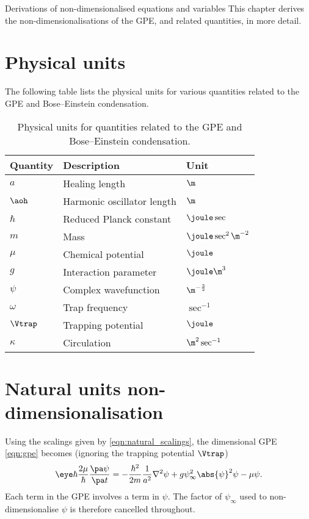 
\begin{chapter}{\label{cha:nondim}Derivations of non-dimensionalised equations
and variables}
  This chapter derives the non-dimensionalisations of the GPE, and related
  quantities, in more detail.

  \section{Physical units}
  The following table lists the physical units for various quantities
  related to the GPE and Bose--Einstein condensation.
  \begin{table}[h]
    \centering
    \begin{tabular}{lll}
      \hline
      Quantity & Description & Unit \\
      \hline
      $a$      & Healing length & $\m$ \\
      $\aoh$   & Harmonic oscillator length & $\m$ \\
      $\hbar$  & Reduced Planck constant & $\joule\sec$ \\
      $m$      & Mass & $\joule\sec^{2}\m^{-2}$ \\
      $\mu$    & Chemical potential & $\joule$ \\
      $g$      & Interaction parameter & $\joule\m^{3}$ \\
      $\psi$   & Complex wavefunction & $\m^{-\frac{3}{2}}$ \\
      $\omega$ & Trap frequency & $\sec^{-1}$ \\
      $\Vtrap$ & Trapping potential & $\joule$ \\
      $\kappa$ & Circulation & $\m^{2}\sec^{-1}$ \\
      \hline\hline
    \end{tabular}
    \caption{Physical units for quantities related to the GPE and
      Bose--Einstein condensation.}
  \end{table}
  
  \section{Natural units non-dimensionalisation}
  Using the scalings given by \eqref{eqn:natural_scalings}, the dimensional GPE
  \eqref{eqn:gpe} becomes (ignoring the trapping potential $\Vtrap$)
  \begin{equation*}
    \eye \hbar \frac{2\mu}{\hbar} \frac{\pa \psi}{\pa t} =
    -\frac{\hbar^{2}}{2m} \frac{1}{a^{2}} \nabla^{2} \psi + g \psi_{\infty}^{2}
    \abs{\psi}^{2} \psi - \mu \psi.
  \end{equation*}
  Each term in the GPE involves a term in $\psi$.  The factor of
  $\psi_{\infty}$ used to non-dimensionalise $\psi$ is therefore cancelled
  throughout.
  

\end{chapter}
